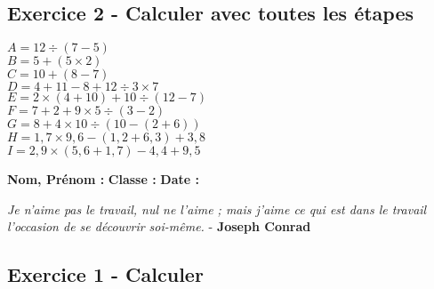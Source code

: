 \subsection*{Exercice 2 - Calculer avec toutes les étapes}

\begin{multicols}{3}
  \noindent
  $A = 12\div (7-5)$ \\
  $B = 5 + (5 \times 2)$ \\
  $C = 10+(8-7)$ \\
  $D = 4+11-8+12\div 3\times 7$ \\
  $E = 2\times (4+10)+10\div (12-7)$ \\
  $F = 7+2+9\times 5\div (3-2)$ \\
  $G = 8+4\times 10\div (10-(2+6))$ \\
  $H = 1{,}7\times 9{,}6-(1{,}2+6{,}3)+3{,}8$ \\
  $I = 2{,}9\times (5{,}6+1{,}7)-4{,}4+9{,}5$ 
\end{multicols}

\vspace{4cm}

\textbf{Nom, Prénom :} \hspace{8cm} \textbf{Classe :} \hspace{3cm} \textbf{Date :}\\
\vspace{-0.8cm}
\begin{center}
  \textit{Je n'aime pas le travail, nul ne l'aime ; mais j'aime ce qui est dans le travail l'occasion de se découvrir soi-même.}  - \textbf{Joseph Conrad}
\end{center}
\vspace{-0.8cm}

\subsection*{Exercice 1 - Calculer}

